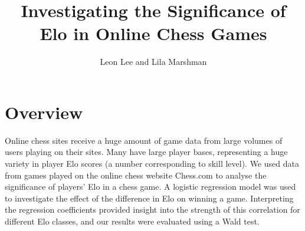 \documentclass[10pt,a4paper]{article}
\title{Investigating the Significance of Elo in Online Chess Games}
\author{Leon Lee and Lila Marshman}
\begin{document}
\maketitle

\section{Overview}
Online chess sites receive a huge amount of game data from large volumes of users playing on their sites. Many have large player bases, representing a huge variety in player Elo scores (a number corresponding to skill level). We used data from games played on the online chess website Chess.com to analyse the significance of players' Elo in a chess game. A logistic regression model was used to investigate the effect of the difference in Elo on winning a game. Interpreting the regression coefficients provided insight into the strength of this correlation for different Elo classes, and our results were evaluated using a Wald test. \newline
\end{document}
